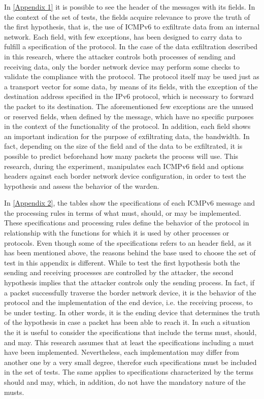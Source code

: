 \documentclass[12pt]{article}
\begin{document}
In \ref{Appendix 1} it is possible to see the header of the messages with its fields. In the context of the set of tests, the fields acquire relevance to prove the truth of the first hypothesis, that is, the use of ICMPv6 to exfiltrate data from an internal network. Each field, with few exceptions, has been designed to carry data to fulfill a specification of the protocol. In the case of the data exfiltration described in this research, where the attacker controls both processes of sending and receiving data, only the border network device may perform some checks to validate the compliance with the protocol. The protocol itself may be used just as a transport vector for some data, by means of its fields, with the exception of the destination address specified in the IPv6 protocol, which is necessary to forward the packet to its destination. The aforementioned few exceptions are the unused or reserved fields, when defined by the message, which have no specific purposes in the context of the functionality of the protocol. In addition, each field shows an important indication for the purpose of exfiltrating data, the bandwidth. In fact, depending on the size of the field and of the data to be exfiltrated, it is possible to predict beforehand how many packets the process will use. This research, during the experiment, manipulates each ICMPv6 field and options headers against each border network device configuration, in order to test the hypothesis and assess the behavior of the warden.

In \ref{Appendix 2}, the tables show the specifications of each ICMPv6 message and the processing rules in terms of what must, should, or may be implemented. These specifications and processing rules define the behavior of the protocol in relationship with the functions for which it is used by other processes or protocols. Even though some of the specifications refers to an header field, as it has been mentioned above, the reasons behind the base used to choose the set of test in this appendix is different. While to test the first hypothesis both the sending and receiving processes are controlled by the attacker, the second hypothesis implies that the attacker controls only the sending process. In fact, if a packet successfully traverse the border network device, it is the behavior of the protocol and the implementation of the end device, i.e. the receiving process, to be under testing. In other words, it is the ending device that determines the truth of the hypothesis in case a packet has been able to reach it. In such a situation the it is useful to consider the specifications that include the terms must, should, and may. This research assumes that at least the specifications including a must have been implemented. Nevertheless, each implementation may differ from another one by a very small degree, therefor such specifications must be included in the set of tests. The same applies to specifications characterized by the terms should and may, which, in addition, do not have the mandatory nature of the musts. 
\end{document}
